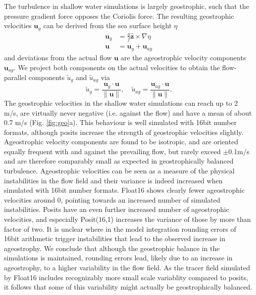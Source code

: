 \documentclass[draft]{agujournal2019}
\begin{document}
The turbulence in shallow water simulations is largely geostrophic, such that the pressure gradient force opposes the Coriolis force. The resulting geostrophic velocities $\mathbf{u}_g$ can be derived from the sea surface height $\eta$
\begin{subequations}
\begin{align}
\mathbf{u}_g &= \frac{g}{f}\hat{\mathbf{z}} \times \nabla \eta \\
\mathbf{u} &= \mathbf{u}_{g} + \mathbf{u}_{ag}
\end{align}
\label{eq:geo}%
\end{subequations}
and deviations from the actual flow $\mathbf{u}$ are the ageostrophic velocity components $\mathbf{u}_{ag}$. We project both components on the actual velocities to obtain the flow-parallel components $\tilde{u}_{g}$ and $\tilde{u}_{ag}$ via
\begin{equation}
\tilde{u}_g = \frac{\mathbf{u}_g \cdot \mathbf{u}}{\| \mathbf{u} \|}, \quad \tilde{u}_{ag} = \frac{\mathbf{u}_{ag} \cdot \mathbf{u}}{\| \mathbf{u} \|}.
\label{eq:parallel}%
\end{equation}
The geostrophic velocities in the shallow water simulations can reach up to 2 m/s, are virtually never negative (i.e. against the flow) and have a mean of about 0.7 m/s (Fig. \ref{fig:geo}a). This behaviour is well simulated with 16bit number formats, although posits increase the strength of geostrophic velocities slightly. Ageostrophic velocity components are found to be isotropic, and are oriented equally frequent with and against the prevailing flow, but rarely exceed $\pm$0.1m/s and are therefore comparably small as expected in geostrophically balanced turbulence. Ageostrophic velocities can be seen as a measure of the physical instabilities in the flow field and their variance is indeed increased when simulated with 16bit number formats. Float16 shows clearly fewer ageostrophic velocities around 0, pointing towards an increased number of simulated instabilities. Posits have an even further increased number of ageostrophic velocities, and especially Posit(16,1) increases the variance of those by more than factor of two. It is unclear where in the model integration rounding errors of 16bit arithmetic trigger instabilities that lead to the observed increase in ageostrophy. We conclude that although the geostrophic balance in the simulations is maintained, rounding errors lead, likely due to an increase in ageostrophy, to a higher variability in the flow field. As the tracer field simulated by Float16 includes recognizably more small scale variablity compared to posits, it follows that some of this variability might actually be geostrophically balanced. 
\end{document}
